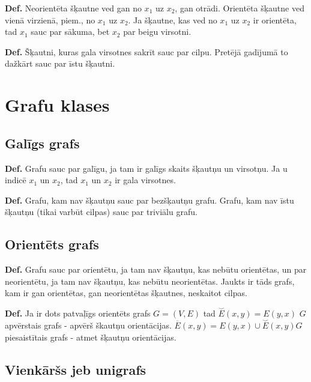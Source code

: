 \documentclass{article}
\begin{document}
\textbf{Def.} Neorientēta šķautne ved gan no $x_1$ uz $x_2$, gan otrādi. Orientēta šķautne ved vienā virzienā, piem., no $x_1$ uz $x_2$. Ja šķautne, kas ved no $x_1$ uz $x_2$ ir orientēta, tad $x_1$ sauc par sākuma, bet $x_2$ par beigu virsotni. 

\textbf{Def.} Šķautni, kuras gala virsotnes sakrīt sauc par cilpu. Pretējā gadījumā to dažkārt sauc par īstu šķautni.

\section{Grafu klases}

\subsection{Galīgs grafs}

\textbf{Def.}  Grafu sauc par galīgu, ja tam ir galīgs skaits šķautņu un virsotņu. Ja u indicē $x_1$ un $x_2$, tad $x_1$ un $x_2$ ir gala virsotnes.


\textbf{Def.} Grafu, kam nav šķautņu sauc par bezšķautņu grafu. Grafu, kam nav īstu šķautņu (tikai varbūt cilpas) sauc par triviālu grafu.

\subsection{Orientēts grafs}

\textbf{Def.} Grafu sauc par orientētu, ja tam nav šķautņu, kas nebūtu orientētas, un par neorientētu, ja tam nav šķautņu, kas nebūtu neorientētas.  Jaukts ir tāds grafs, kam ir gan orientētas, gan neorientētas šķautnes, neskaitot cilpas.

\textbf{Def.} Ja ir dots patvaļīgs orientēts grafs $G=(V,E)$ tad $\overset{\smallsmile}{E}(x, y ) = E (y , x )$ $ G $ apvērstais grafs - apvērš škautņu orientācijas. $\overline{E} (x, y ) = E (y , x)\cup \overset{\smallsmile}{E} (x, y ) G$ piesaistītais grafs - atmet šķautņu orientācijas. 


\subsection{Vienkāršs jeb unigrafs}
\end{document}
